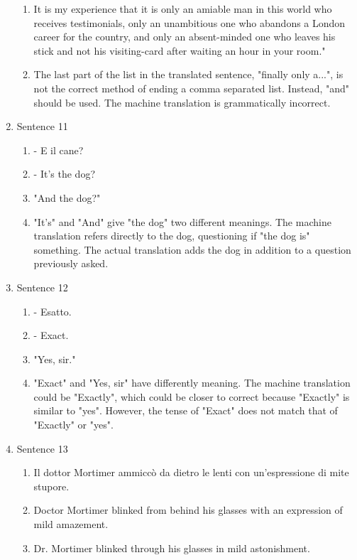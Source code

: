 \documentclass{article}
\begin{document}
\begin{enumerate}
\begin{enumerate}[label=(\alph*)]
        \item It is my experience that it is only an amiable man in this world who receives testimonials, only an unambitious one who abandons a London career for the country, and only an absent-minded one who leaves his stick and not his visiting-card after waiting an hour in your room."
        \item The last part of the list in the translated sentence, "finally only a...", is not the correct method of ending a comma 
            separated list. Instead, "and" should be used. The machine translation is grammatically incorrect.
    \end{enumerate}   
    \item Sentence 11
    \begin{enumerate}[label=(\alph*)]
        \item    - E il cane?
        \item - It's the dog?
        \item "And the dog?"
        \item "It's" and "And" give "the dog" two different meanings. The machine translation refers directly to the dog, questioning if "the dog is" something. 
            The actual translation adds the dog in addition to a question previously asked.
    \end{enumerate}   
    \item Sentence 12
    \begin{enumerate}[label=(\alph*)]
        \item     - Esatto.
        \item - Exact.
        \item "Yes, sir."
        \item "Exact" and "Yes, sir" have differently meaning. The machine translation could be "Exactly", which could be closer to 
            correct because "Exactly" is similar to "yes". However, the tense of "Exact" does not match that of "Exactly" or "yes".
    \end{enumerate}   
    \item Sentence 13
    \begin{enumerate}[label=(\alph*)]
        \item   Il dottor Mortimer ammiccò da dietro le lenti con un'espressione di mite stupore.
        \item Doctor Mortimer blinked from behind his glasses with an expression of mild amazement.
        \item   Dr. Mortimer blinked through his glasses in mild astonishment.

\end{enumerate}
\end{enumerate}
\end{document}
